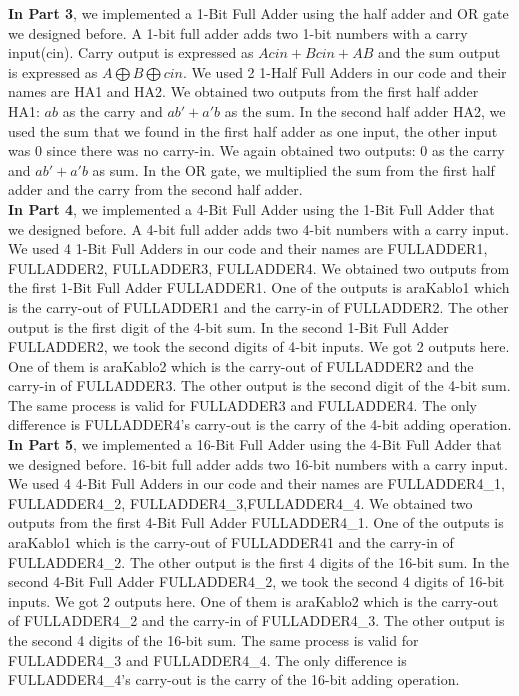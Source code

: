\documentclass[pdftex,12pt,a4paper]{article}
\begin{document}
\textbf{In Part 3}, we implemented a 1-Bit Full Adder using the half adder and OR gate we designed before. A 1-bit full adder adds two 1-bit numbers with a carry input(cin). Carry output is expressed as \(Acin+Bcin+AB\) and the sum output is expressed as \(A⨁B⨁cin.\) We used 2 1-Half Full Adders in our code and their names are HA1 and HA2. We obtained two outputs from the first half adder HA1: \(ab\) as the carry and \(ab'+a'b\) as the sum. In the second half adder HA2, we used the sum that we found in the first half adder as one input, the other input was 0 since there was no carry-in. We again obtained two outputs: 0 as the carry and \(ab'+a'b\) as sum. In the OR gate, we multiplied the sum from the first half adder and the carry from the second half adder. 
\\

\textbf{In Part 4}, we implemented a 4-Bit Full Adder using the 1-Bit Full Adder that we designed before. A 4-bit full adder adds two 4-bit numbers with a carry input.  We used 4 1-Bit Full Adders in our code and their names are FULLADDER1, FULLADDER2, FULLADDER3, FULLADDER4. We obtained two outputs from the first 1-Bit Full Adder FULLADDER1. One of the outputs is araKablo1 which is the carry-out of  FULLADDER1 and the carry-in of FULLADDER2. The other output is the first digit of the 4-bit sum. In the second 1-Bit Full Adder FULLADDER2, we took the second digits of 4-bit inputs. We got 2 outputs here. One of them is araKablo2 which is the carry-out of  FULLADDER2 and the carry-in of FULLADDER3. The other output is the second digit of the 4-bit sum. The same process is valid for FULLADDER3 and FULLADDER4. The only difference is FULLADDER4's carry-out is the carry of the 4-bit adding operation.\\

\textbf{In Part 5}, we implemented a 16-Bit Full Adder using the 4-Bit Full Adder that we designed before. 16-bit full adder adds two 16-bit numbers with a carry input. We used 4 4-Bit Full Adders in our code and their names are FULLADDER4\_1, FULLADDER4\_2, FULLADDER4\_3,FULLADDER4\_4. We obtained two outputs from the first 4-Bit Full Adder FULLADDER4\_1. One of the outputs is araKablo1 which is the carry-out of  FULLADDER41 and the carry-in of FULLADDER4\_2. The other output is the first 4 digits of the 16-bit sum. In the second 4-Bit Full Adder FULLADDER4\_2, we took the second 4 digits of 16-bit inputs. We got 2 outputs here. One of them is araKablo2 which is the carry-out of  FULLADDER4\_2 and the carry-in of FULLADDER4\_3. The other output is the second 4 digits of the 16-bit sum. The same process is valid for FULLADDER4\_3 and FULLADDER4\_4. The only difference is FULLADDER4\_4's carry-out is the carry of the 16-bit adding operation.\\
\end{document}
